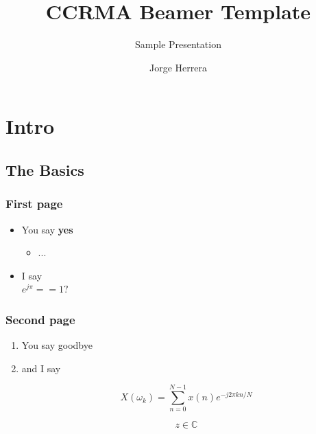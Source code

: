 \documentclass{beamer}
\title{CCRMA Beamer Template}
\subtitle{Sample Presentation}
\author{Jorge Herrera}
\date
\begin{document}
\begin{frame}[plain]
    \titlepage
\end{frame}
\addtocounter{framenumber}{-1}  %


\begin{frame}[plain]
    \tableofcontents
\end{frame}
\addtocounter{framenumber}{-1}  %

\section[Intro]{Intro}
\begin{frame}[plain]
    \tableofcontents[currentsection]
\end{frame}
\addtocounter{framenumber}{-1}  %

\subsection[basics]{The Basics}

\begin{frame}\frametitle{First page}
    \begin{itemize}
    \item You say \textbf{yes}
        \begin{itemize}
        \item ...
        \end{itemize}
    \item I say \\
    \centering
    $e^{j \pi} == 1?$
    \end{itemize}

\end{frame}

\begin{frame}\frametitle{Second page}
    \begin{enumerate}
    \item You say goodbye
    \item and I say

    \begin{equation}
    X(\omega_k) = \sum_{n=0}^{N-1}x(n)e^{-j2\pi kn/N}
    \end{equation}

    \begin{equation}
    z \in \mathbb{C}
    \end{equation}

    \end{enumerate}
\end{frame}
\end{document}
